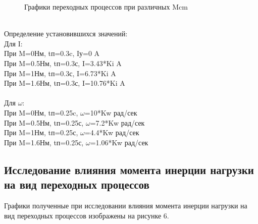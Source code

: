 \documentclass[a4paper, 12pt]{article}
\begin{document}
\begin{figure}[h]
	\begin{minipage}[h]{0.55\linewidth}
	\end{minipage}
	\hfill
	\begin{minipage}[h]{0.55\linewidth}
	\end{minipage}
	\vfill
	\begin{minipage}[h]{0.55\linewidth}
		\centering{\texttt{[image: w2]} \\ $\omega$}
	\end{minipage}
	\hfill
	\begin{minipage}[h]{0.55\linewidth}
	\end{minipage}
	\caption{Графики переходных процессов при различных Mcm}
\end{figure}\\
Определение установившихся значений:\\
Для I:\\
При M=0Нм, tп=0.3c, Iу=0 A\\
При M=0.5Нм, tп=0.3с, I=3.43*Ki A\\
При M=1Нм, tп=0.3с, I=6.73*Ki A\\
При M=1.6Нм, tп=0.3с, I=10.76*Ki A\\
\newpage\hfill\\
Для $\omega$:\\
При M=0Нм, tп=0.25c,  $\omega$=10*Kw рад/сек\\
При M=0.5Нм, tп=0.25с, $\omega$=7.2*Kw рад/сек\\
При M=1Нм, tп=0.25с, $\omega$=4.4*Kw рад/сек\\
При M=1.6Нм, tп=0.25с, $\omega$=1.06*Kw рад/сек\\
\newpage
\begin{center}
	\section{Исследование влияния момента инерции нагрузки на вид переходных процессов}
\end{center}\par
Графики полученные при исследовании влияния момента инерции нагрузки на вид переходных процессов изображены на рисунке 6.
\end{document}
